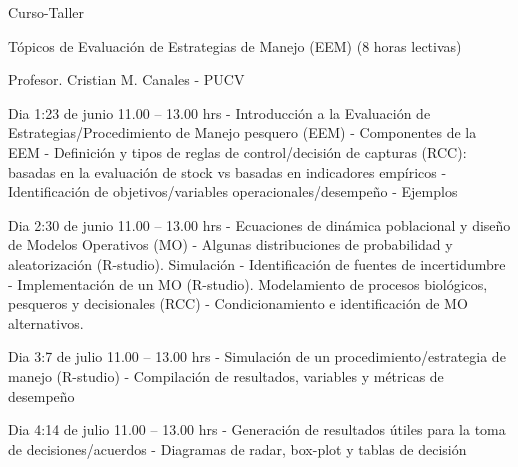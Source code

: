 Curso-Taller

Tópicos de Evaluación de Estrategias de Manejo (EEM) (8 horas lectivas)

Profesor.  Cristian M. Canales - PUCV

Dia 1:​23 de junio 11.00 – 13.00 hrs
- Introducción a la Evaluación de Estrategias/Procedimiento de Manejo pesquero (EEM)
- Componentes de la EEM
- Definición y tipos de reglas de control/decisión de capturas (RCC): basadas en la evaluación de stock vs basadas en indicadores empíricos
- Identificación de objetivos/variables operacionales/desempeño
- Ejemplos

Dia 2:​30 de junio 11.00 – 13.00 hrs
- Ecuaciones de dinámica poblacional y diseño de Modelos Operativos (MO)
- Algunas distribuciones de probabilidad y aleatorización (R-studio). Simulación
- Identificación de fuentes de incertidumbre
- Implementación de un MO (R-studio). Modelamiento de procesos biológicos, pesqueros y decisionales (RCC)
- Condicionamiento e identificación de MO alternativos.

Dia 3:​7 de julio 11.00 – 13.00 hrs
- Simulación de un procedimiento/estrategia de manejo (R-studio)
- Compilación de resultados, variables y métricas de desempeño

Dia 4:​14 de julio 11.00 – 13.00 hrs
- Generación de resultados útiles para la toma de decisiones/acuerdos
- Diagramas de radar, box-plot y tablas de decisión
